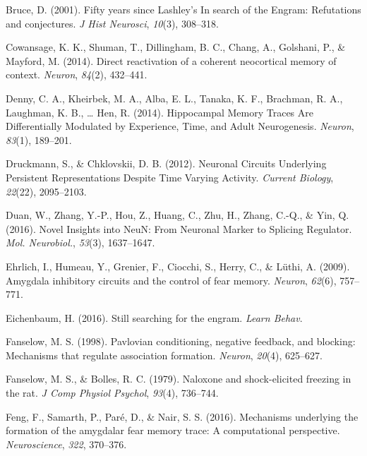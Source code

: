 \documentclass[12pt,a4paper,]{report}
\begin{document}
\hypertarget{ref-bruceux5ffiftyux5f2001}{}
Bruce, D. (2001). Fifty years since Lashley's In search of the Engram:
Refutations and conjectures. \emph{J Hist Neurosci}, \emph{10}(3),
308--318.

\hypertarget{ref-cowansageux5fdirectux5f2014}{}
Cowansage, K. K., Shuman, T., Dillingham, B. C., Chang, A., Golshani,
P., \& Mayford, M. (2014). Direct reactivation of a coherent neocortical
memory of context. \emph{Neuron}, \emph{84}(2), 432--441.

\hypertarget{ref-dennyux5fhippocampalux5f2014}{}
Denny, C. A., Kheirbek, M. A., Alba, E. L., Tanaka, K. F., Brachman, R.
A., Laughman, K. B., \ldots{} Hen, R. (2014). Hippocampal Memory Traces
Are Differentially Modulated by Experience, Time, and Adult
Neurogenesis. \emph{Neuron}, \emph{83}(1), 189--201.

\hypertarget{ref-druckmannux5fneuronalux5f2012}{}
Druckmann, S., \& Chklovskii, D. B. (2012). Neuronal Circuits Underlying
Persistent Representations Despite Time Varying Activity. \emph{Current
Biology}, \emph{22}(22), 2095--2103.

\hypertarget{ref-duanux5fnovelux5f2016}{}
Duan, W., Zhang, Y.-P., Hou, Z., Huang, C., Zhu, H., Zhang, C.-Q., \&
Yin, Q. (2016). Novel Insights into NeuN: From Neuronal Marker to
Splicing Regulator. \emph{Mol. Neurobiol.}, \emph{53}(3), 1637--1647.

\hypertarget{ref-ehrlichux5famygdalaux5f2009}{}
Ehrlich, I., Humeau, Y., Grenier, F., Ciocchi, S., Herry, C., \& Lüthi,
A. (2009). Amygdala inhibitory circuits and the control of fear memory.
\emph{Neuron}, \emph{62}(6), 757--771.

\hypertarget{ref-eichenbaumux5fstillux5f2016}{}
Eichenbaum, H. (2016). Still searching for the engram. \emph{Learn
Behav}.

\hypertarget{ref-fanselowux5fpavlovianux5f1998}{}
Fanselow, M. S. (1998). Pavlovian conditioning, negative feedback, and
blocking: Mechanisms that regulate association formation. \emph{Neuron},
\emph{20}(4), 625--627.

\hypertarget{ref-fanselowux5fnaloxoneux5f1979}{}
Fanselow, M. S., \& Bolles, R. C. (1979). Naloxone and shock-elicited
freezing in the rat. \emph{J Comp Physiol Psychol}, \emph{93}(4),
736--744.

\hypertarget{ref-fengux5fmechanismsux5f2016}{}
Feng, F., Samarth, P., Paré, D., \& Nair, S. S. (2016). Mechanisms
underlying the formation of the amygdalar fear memory trace: A
computational perspective. \emph{Neuroscience}, \emph{322}, 370--376.
\end{document}
